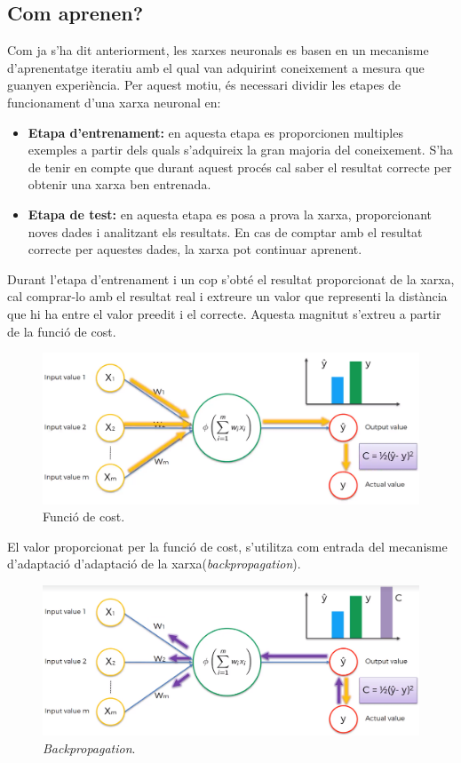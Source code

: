 \documentclass[12pt]{article}
\begin{document}
\subsection{Com aprenen?}
Com ja s'ha dit anteriorment, les xarxes neuronals es basen en un mecanisme d'aprenentatge iteratiu amb el qual van adquirint coneixement a mesura que guanyen experiència. Per aquest motiu, és necessari dividir les etapes de funcionament d'una xarxa neuronal en:
\begin{itemize}
	\item \textbf{Etapa d'entrenament:} en aquesta etapa es proporcionen multiples exemples a partir dels quals s'adquireix la gran majoria del coneixement. S'ha de tenir en compte que durant aquest procés cal saber el resultat correcte per obtenir una xarxa ben entrenada.
	\item \textbf{Etapa de test:} en aquesta etapa es posa a prova la xarxa, proporcionant noves dades i analitzant els resultats. En cas de comptar amb el resultat correcte per aquestes dades, la xarxa pot continuar aprenent.
\end{itemize}
Durant l'etapa d'entrenament i un cop s'obté el resultat proporcionat de la xarxa, cal comprar-lo amb el resultat real i extreure un valor que representi la distància que hi ha entre el valor preedit i el correcte. Aquesta magnitut s'extreu a partir de la funció de cost. 
\begin{figure}[h!]
	\centering
	\includegraphics[scale=0.3]{imatges/aprendre/1aprendre.png}
	\caption{Funció de cost.}
\end{figure}
El valor proporcionat per la funció de cost, s'utilitza com entrada del mecanisme d'adaptació d'adaptació de la xarxa(\textit{backpropagation}).
\begin{figure}[h!]
	\centering
	\includegraphics[scale=0.3]{imatges/aprendre/2bp.png}
	\caption{\textit{Backpropagation}.}
\end{figure}
\end{document}
